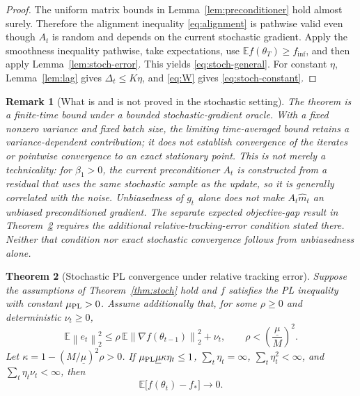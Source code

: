 \documentclass[11pt]{article}
\newtheorem{theorem}{Theorem}[section]
\newtheorem{remark}[theorem]{Remark}
\newcommand{\E}{\mathbb{E}}
\newcommand{\norm}[1]{\left\lVert #1\right\rVert}
\begin{document}
\begin{proof}
The uniform matrix bounds in Lemma~\ref{lem:preconditioner} hold almost surely. Therefore the alignment inequality \eqref{eq:alignment} is pathwise valid even though $A_t$ is random and depends on the current stochastic gradient. Apply the smoothness inequality pathwise, take expectations, use $\E f(\theta_T)\ge f_{\inf}$, and then apply Lemma~\ref{lem:stoch-error}. This yields \eqref{eq:stoch-general}. For constant $\eta$, Lemma~\ref{lem:lag} gives $\Delta_t\le K\eta$, and \eqref{eq:W} gives \eqref{eq:stoch-constant}.
\end{proof}

\begin{remark}[What is and is not proved in the stochastic setting]
The theorem is a finite-time bound under a bounded stochastic-gradient oracle. With a fixed nonzero variance and fixed batch size, the limiting time-averaged bound retains a variance-dependent contribution; it does not establish convergence of the iterates or pointwise convergence to an exact stationary point. This is not merely a technicality: for $\beta_1>0$, the current preconditioner $A_t$ is constructed from a residual that uses the same stochastic sample as the update, so it is generally correlated with the noise. Unbiasedness of $g_t$ alone does not make $A_t\widehat m_t$ an unbiased preconditioned gradient. The separate expected objective-gap result in Theorem~\ref{thm:stoch-pl} requires the additional relative-tracking-error condition stated there. Neither that condition nor exact stochastic convergence follows from unbiasedness alone.
\end{remark}

\begin{theorem}[Stochastic PL convergence under relative tracking error]\label{thm:stoch-pl}
Suppose the assumptions of Theorem~\ref{thm:stoch} hold and $f$ satisfies the PL inequality with constant $\mu_{\rm PL}>0$. Assume additionally that, for some $\rho\ge0$ and deterministic $\nu_t\ge0$,
\begin{equation}
 \E\norm{e_t}_2^2\le\rho\,\E\norm{\nabla f(\theta_{t-1})}_2^2+\nu_t,
 \qquad
 \rho<\left(\frac{\underline\mu}{M}\right)^2.
 \label{eq:relative-error}
\end{equation}
Let $\kappa=1-(M/\underline\mu)^2\rho>0$. If $\mu_{\rm PL}\underline\mu\kappa\eta_t\le1$, $\sum_t\eta_t=\infty$, $\sum_t\eta_t^2<\infty$, and $\sum_t\eta_t\nu_t<\infty$, then
\[
 \E\bigl[f(\theta_t)-f_*\bigr]\longrightarrow0.
\]
\end{theorem}
\end{document}
